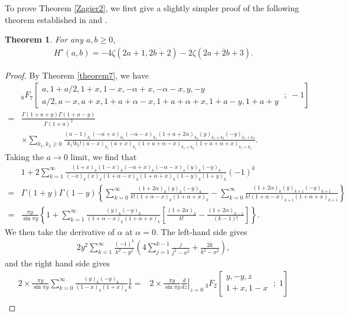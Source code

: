 \documentclass[reqno]{amsart}
\newtheorem{theorem}{Theorem}[section]
\theoremstyle{definition}
\theoremstyle{remark}
\numberwithin{equation}{section}
\begin{document}
To prove Theorem \ref{Zagier2}, we first give a slightly simpler proof of the following theorem established in \cite{3} and \cite{16}.
\begin{theorem}\label{Pilehrood2}For any $a, b\geq 0$,
\begin{align}\label{eq66} H^{\star}(a, b)=-4\zeta\left(2a+1, \overline{2b+2}\right)-2\zeta\left(\overline{2a+2b+3}\right).\end{align}
\end{theorem}
\begin{proof}
By Theorem \ref{theorem7}, we have
\begin{align*}
&_8F_7\left[\begin{aligned} a, 1+a/2,  1+x, 1-x, -\alpha+x, -\alpha-x, y, -y\hspace{2cm}\\a/2,a-x, a+x,  1+a+\alpha-x, 1+a+\alpha+x, 1+a-y, 1+a+y \end{aligned}\;;\;-1\right]\\
=&\frac{\Gamma(1+a+y)\Gamma(1+a-y)}{\Gamma(1+a)^2}\\&\times\sum_{k_1, k_2\geq 0}\frac{(a-1)_{k_1}(-\alpha+x)_{k_1}(-\alpha-x)_{k_1}(1+a+2\alpha)_{k_2}(y)_{k_1+k_2}(-y)_{k_1+k_2}}
{k_1!k_2!(a-x)_{k_1}(a+x)_{k_1}(1+a+\alpha-x)_{k_1+k_2}(1+a+\alpha+x)_{k_1+k_2}}.
\end{align*}
Taking the $a\rightarrow 0$ limit, we find that
\begin{align*}
&1+2\sum_{k=1}^{\infty}\frac{(1+x)_k(1-x)_k(-\alpha+x)_{k}(-\alpha-x)_k(y)_k(-y)_k}{(-x)_k(x)_k(1+\alpha-x)_k(1+\alpha+x)_k(1-y)_k(1+y)_k}(-1)^k\\
=&\Gamma(1+y)\Gamma(1-y)\left\{\sum_{k=0 }^{\infty} \frac{(1+2\alpha)_{k} (y)_{k}(-y)_{k}}{k! (1+\alpha-x)_{k}(1+\alpha+x)_{k}}-\sum_{k=0}^{\infty}\frac{(1+2\alpha)_{k} (y)_{k+1}(-y)_{k+1}}{k!(1+\alpha-x)_{k+1}(1+\alpha+x)_{k+1} }\right\}\\
=&\frac{\pi y}{\sin \pi y}\left\{1+\sum_{k=1 }^{\infty} \frac{ (y)_{k}(-y)_{k}}{ (1+\alpha-x)_{k}(1+\alpha+x)_{k}}\left[\frac{(1+2\alpha)_{k}}{k!}-\frac{(1+2\alpha)_{k-1}}{(k-1)!}\right]\right\}.
\end{align*}
We then take the derivative of $\alpha$ at $\alpha=0$.
The left-hand side gives
\begin{align*}
2y^2\sum_{k=1}^{\infty} \frac{(-1)^k}{k^2-y^2}\left(4\sum_{j=1}^{k-1}\frac{j}{j^2-x^2}+\frac{2k}{k^2-x^2}\right),
\end{align*}and the right hand side gives
\begin{align*}
2\times\frac{\pi y}{\sin \pi y}\sum_{k=0 }^{\infty} \frac{ (y)_{k}(-y)_{k}}{ (1 -x)_{k}(1+x)_{k}}\frac{1}{k}=&2\times\frac{\pi y}{\sin\pi y} \left.\frac{d}{dz}\right|_{z=0}\,_3F_2\left[\begin{aligned} y,-y,z\quad\\1+x,1-x\end{aligned}\;;\;1\right]\\

\end{align*}
\end{proof}
\end{document}
